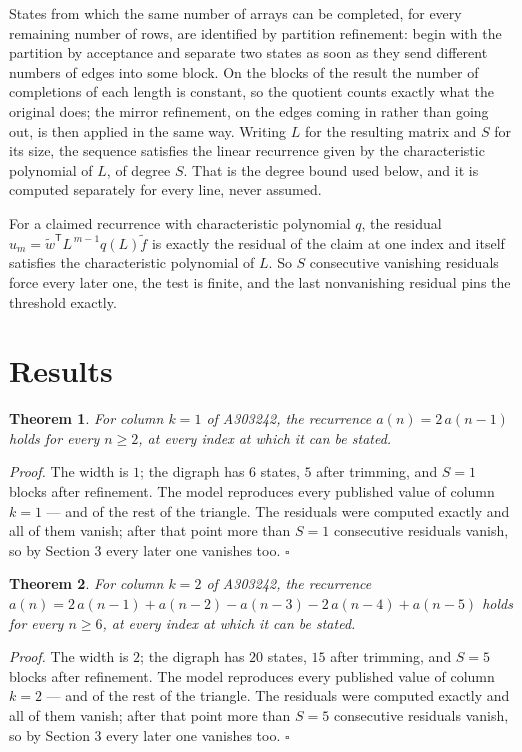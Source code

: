 \documentclass[11pt]{article}
\newtheorem{theorem}{Theorem}
\theoremstyle{definition}
\begin{document}
States from which the same number of arrays can be completed, for every remaining number of rows, are identified by partition refinement: begin with the partition by acceptance and separate two states as soon as they send different numbers of edges into some block. On the blocks of the result the number of completions of each length is constant, so the quotient counts exactly what the original does; the mirror refinement, on the edges coming in rather than going out, is then applied in the same way. Writing $L$ for the resulting matrix and $S$ for its size, the sequence satisfies the linear recurrence given by the characteristic polynomial of $L$, of degree $S$. That is the degree bound used below, and it is computed separately for every line, never assumed.

For a claimed recurrence with characteristic polynomial $q$, the residual $u_m = \tilde w^{\mathsf T}L^{\,m-1}q(L)\tilde f$ is exactly the residual of the claim at one index and itself satisfies the characteristic polynomial of $L$. So $S$ consecutive vanishing residuals force every later one, the test is finite, and the last nonvanishing residual pins the threshold exactly.

\section{Results}

\begin{theorem} For column $k = 1$ of A303242, the recurrence $a(n) = 2\,a(n-1)$ holds for every $n \ge 2$, at every index at which it can be stated.\end{theorem}

{\itshape Proof.} The width is $1$; the digraph has $6$ states, $5$ after trimming, and $S = 1$ blocks after refinement. The model reproduces every published value of column $k = 1$ --- and of the rest of the triangle. The residuals were computed exactly and all of them vanish; after that point more than $S = 1$ consecutive residuals vanish, so by Section 3 every later one vanishes too. $\square$

\begin{theorem} For column $k = 2$ of A303242, the recurrence $a(n) = 2\,a(n-1) + a(n-2) - a(n-3) - 2\,a(n-4) + a(n-5)$ holds for every $n \ge 6$, at every index at which it can be stated.\end{theorem}

{\itshape Proof.} The width is $2$; the digraph has $20$ states, $15$ after trimming, and $S = 5$ blocks after refinement. The model reproduces every published value of column $k = 2$ --- and of the rest of the triangle. The residuals were computed exactly and all of them vanish; after that point more than $S = 5$ consecutive residuals vanish, so by Section 3 every later one vanishes too. $\square$
\end{document}
